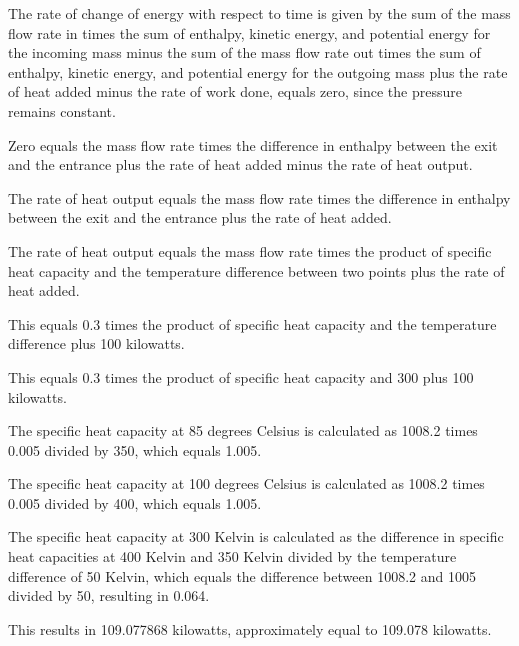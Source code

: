The rate of change of energy with respect to time is given by the sum of the mass flow rate in times the sum of enthalpy, kinetic energy, and potential energy for the incoming mass minus the sum of the mass flow rate out times the sum of enthalpy, kinetic energy, and potential energy for the outgoing mass plus the rate of heat added minus the rate of work done, equals zero, since the pressure remains constant.

Zero equals the mass flow rate times the difference in enthalpy between the exit and the entrance plus the rate of heat added minus the rate of heat output.

The rate of heat output equals the mass flow rate times the difference in enthalpy between the exit and the entrance plus the rate of heat added.

The rate of heat output equals the mass flow rate times the product of specific heat capacity and the temperature difference between two points plus the rate of heat added.

This equals 0.3 times the product of specific heat capacity and the temperature difference plus 100 kilowatts.

This equals 0.3 times the product of specific heat capacity and 300 plus 100 kilowatts.

The specific heat capacity at 85 degrees Celsius is calculated as 1008.2 times 0.005 divided by 350, which equals 1.005.

The specific heat capacity at 100 degrees Celsius is calculated as 1008.2 times 0.005 divided by 400, which equals 1.005.

The specific heat capacity at 300 Kelvin is calculated as the difference in specific heat capacities at 400 Kelvin and 350 Kelvin divided by the temperature difference of 50 Kelvin, which equals the difference between 1008.2 and 1005 divided by 50, resulting in 0.064.

This results in 109.077868 kilowatts, approximately equal to 109.078 kilowatts.